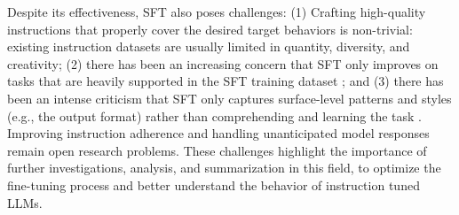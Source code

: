 \documentclass[11pt]{article}
\begin{document}
Despite its effectiveness, SFT  also poses challenges: (1) Crafting high-quality instructions that properly cover the desired target behaviors is non-trivial:
existing instruction datasets are usually limited in quantity, diversity, and creativity;
(2) there has been an increasing concern that SFT only  improves on  tasks that are heavily supported in the SFT training dataset \cite{gudibande2023false}; and
(3) there has been an intense criticism that SFT only
 captures surface-level patterns and styles (e.g., the output format) rather than comprehending and learning the  task \cite{Kung2023DoMR}.
Improving instruction adherence and handling unanticipated model responses remain open research problems. These challenges highlight the importance of further investigations, analysis, and summarization in this field, to optimize the fine-tuning process and better understand the behavior of instruction tuned LLMs.
\end{document}
